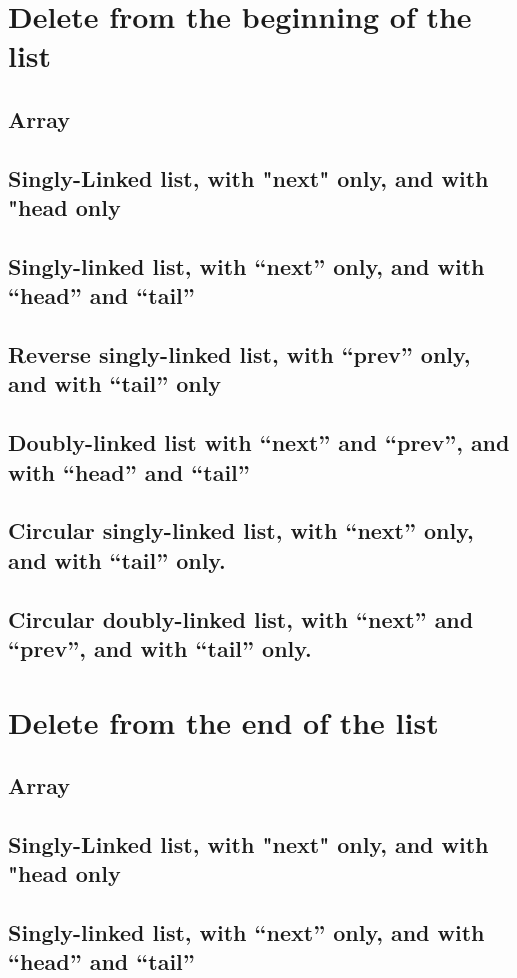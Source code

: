 \documentclass{article}
\begin{document}
\section{Delete from the beginning of the list}
\subsection{Array}
\subsection{Singly-Linked list, with "next" only, and with "head only}
\subsection{Singly-linked list, with “next” only, and with “head” and “tail”}
\subsection{Reverse singly-linked list, with “prev” only, and with “tail” only}
\subsection{Doubly-linked list with “next” and “prev”, and with “head” and “tail”}
\subsection{Circular singly-linked list, with “next” only, and with “tail” only.}
\subsection{Circular doubly-linked list, with “next” and “prev”, and with “tail” only.}

\section{Delete from the end of the list}
\subsection{Array}
\subsection{Singly-Linked list, with "next" only, and with "head only}
\subsection{Singly-linked list, with “next” only, and with “head” and “tail”}
\end{document}
